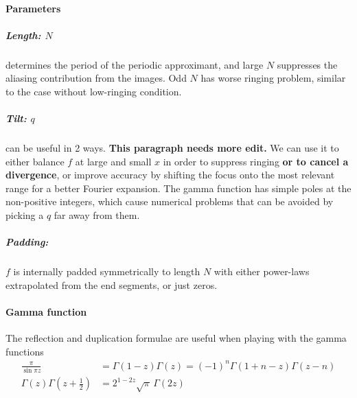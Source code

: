 \documentclass{article}
\begin{document}
\paragraph{Parameters}


\subparagraph{Length: $N$}
determines the period of the periodic approximant, and large $N$ suppresses
the aliasing contribution from the images.
Odd $N$ has worse ringing problem, similar to the case without low-ringing condition.


\subparagraph{Tilt: $q$}
can be useful in 2 ways.
\textbf{This paragraph needs more edit.}
We can use it to either balance $f$ at large and small $x$ in order to suppress
ringing \textbf{or to cancel a divergence}, or improve accuracy by shifting the
focus onto the most relevant range for a better Fourier expansion.
The gamma function has simple poles at the non-positive integers, which cause
numerical problems that can be avoided by picking a $q$ far away from them.


\subparagraph{Padding:}
$f$ is internally padded symmetrically to length $N$ with either power-laws
extrapolated from the end segments, or just zeros.


\paragraph{Gamma function}
The reflection and duplication formulae are useful when playing with the gamma
functions
\begin{align}
    \frac\pi{\sin\pi z} &= \Gamma(1-z)\Gamma(z) = (-1)^n\Gamma(1+n-z)\Gamma(z-n) \\
    \Gamma(z)\Gamma(z+\tfrac12) &= 2^{1-2z}\sqrt\pi\,\Gamma(2z)
\end{align}




\end{document}
